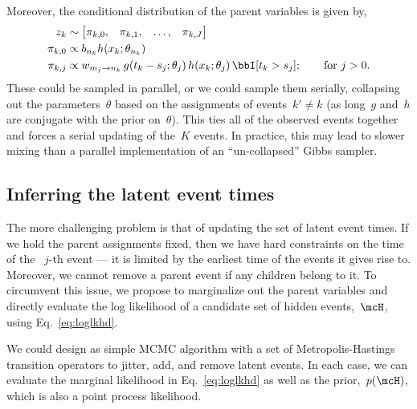 Moreover, the conditional distribution of the parent variables is given by,
\begin{align}
  z_k &\sim
  \begin{bmatrix}
        \pi_{k,0}, & \pi_{k,1}, & \ldots, &\pi_{k,J}
  \end{bmatrix}  \\
  \pi_{k,0} &\propto b_{n_k} h(x_k; \theta_{n_k}) \\
  \pi_{k,j} &\propto w_{m_j \to n_k} \, g(t_k - s_j; \theta_j) \, h(x_k ; \theta_j) \, \bbI[t_k > s_j]; \qquad \text{for }j>0.
\end{align}
These could be sampled in parallel, or we could sample them
serially, collapsing out the parameters~$\theta$ based on
the assignments of events~$k' \neq k$ (as long~$g$ and~$h$ are conjugate
with the prior on~$\theta$). This ties all of the observed
events together and forces a serial updating of the~$K$ events.
In practice, this may lead to slower mixing than a parallel
implementation of an ``un-collapsed'' Gibbs sampler. 

\subsection{Inferring the latent event times}
The more challenging problem is that of updating the
set of latent event times. If we hold the parent assignments
fixed, then we have hard constraints on the time of the
~$j$-th event --- it is limited by the earliest time of
the events it gives rise to. Moreover, we cannot remove
a parent event if any children belong to it. To circumvent
this issue, we propose to marginalize out the parent
variables and directly evaluate the log likelihood of a
candidate set of hidden events,~$\mcH$, using Eq.~\eqref{eq:loglkhd}.

We could design as simple MCMC algorithm with a set of
Metropolis-Hastings transition operators to jitter, add,
and remove latent events. In each case, we can evaluate
the marginal likelihood in Eq.~\eqref{eq:loglkhd} as
well as the prior,~$p(\mcH)$, which is also a point
process likelihood.

